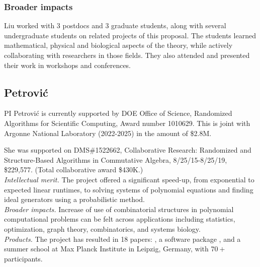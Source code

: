 \documentclass[11pt]{NSFamsart}
\begin{document}
\subsubsection*{Broader impacts}  Liu worked with
3 postdocs and 3 graduate students, along with several undergraduate students 
on related projects of this proposal. 
The students learned mathematical, physical and biological
aspects of the theory, while actively collaborating  with researchers in those fields.
They also attended and presented their work in workshops and conferences.


\subsection*{Petrovi\'c} PI Petrovi\'c is currently supported by DOE Office of Science, Randomized Algorithms for Scientific Computing, Award number 1010629. This is joint with Argonne National Laboratory (2022-2025) in the amount of \$2.8M.

She was supported on DMS\#1522662, Collaborative Research: Randomized and Structure-Based Algorithms in Commutative Algebra, 8/25/15-8/25/19, \$229,577. (Total collaborative award \$430K.)
\\
\emph{Intellectual merit.} The project offered  a  significant speed-up, from exponential  to expected linear runtimes, to   solving systems of polynomial equations and finding ideal generators   using a probabilistic method.  
 \\
\emph{Broader impacts.} Increase of use of combinatorial structures in polynomial computational problems can be felt across applications including statistics, optimization, graph theory, combinatorics, and systems biology. 
\\
\emph{Products.}
 The project has resulted in 18 papers: \cite{GKP-fienberg, RMI, semigroups, AlgStatNtwk-ARSIA, WhatIsMB, jalgstat-fienberg-editorial, karwa2016dergms, hypergraphs-toric, jesus1, jesus2, jesus3, jesus4, jesus5, jesus6, jesus7, algebraicViolators, bouquets, surveyAlgStatCONMchp},   
 a software package \cite{RMIm2}, 
and a  summer school at Max Planck Institute in Leipzig, Germany,  with $70+$ participants. 
\end{document}
